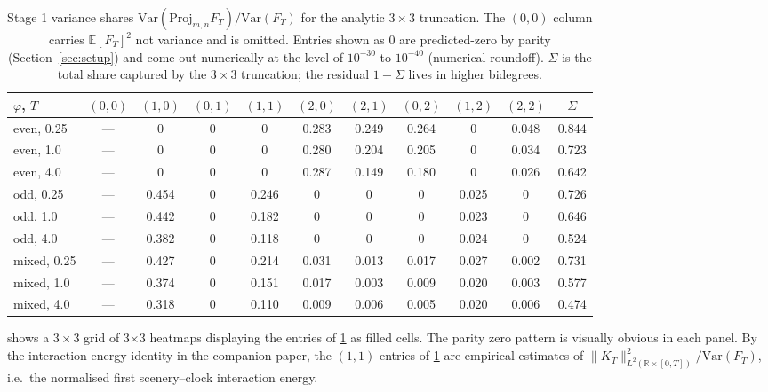 \documentclass[11pt,reqno]{amsart}
\theoremstyle{plain}
\theoremstyle{definition}
\theoremstyle{remark}
\newcommand{\R}{\mathbb{R}}
\newcommand{\E}{\mathbb{E}}
\newcommand{\Var}{\mathrm{Var}}
\newcommand{\Proj}{\mathrm{Proj}}
\begin{document}
\begin{table}[h]
\centering
\small
\begin{tabular}{lcccccccccc}
\toprule
$\varphi$, $T$ &
$(0,0)$ & $(1,0)$ & $(0,1)$ & $(1,1)$ & $(2,0)$ & $(2,1)$ &
$(0,2)$ & $(1,2)$ & $(2,2)$ & $\Sigma$\\
\midrule
even, 0.25  & --- & 0     & 0     & 0     & 0.283 & 0.249 & 0.264 & 0     & 0.048 & 0.844 \\
even, 1.0   & --- & 0     & 0     & 0     & 0.280 & 0.204 & 0.205 & 0     & 0.034 & 0.723 \\
even, 4.0   & --- & 0     & 0     & 0     & 0.287 & 0.149 & 0.180 & 0     & 0.026 & 0.642 \\[2pt]
odd, 0.25   & --- & 0.454 & 0     & 0.246 & 0     & 0     & 0     & 0.025 & 0     & 0.726 \\
odd, 1.0    & --- & 0.442 & 0     & 0.182 & 0     & 0     & 0     & 0.023 & 0     & 0.646 \\
odd, 4.0    & --- & 0.382 & 0     & 0.118 & 0     & 0     & 0     & 0.024 & 0     & 0.524 \\[2pt]
mixed, 0.25 & --- & 0.427 & 0     & 0.214 & 0.031 & 0.013 & 0.017 & 0.027 & 0.002 & 0.731 \\
mixed, 1.0  & --- & 0.374 & 0     & 0.151 & 0.017 & 0.003 & 0.009 & 0.020 & 0.003 & 0.577 \\
mixed, 4.0  & --- & 0.318 & 0     & 0.110 & 0.009 & 0.006 & 0.005 & 0.020 & 0.006 & 0.474 \\
\bottomrule
\end{tabular}
\caption{Stage 1 variance shares $\Var(\Proj_{m,n} F_T) / \Var(F_T)$
for the analytic $3 \times 3$ truncation. The $(0,0)$ column carries
$\E[F_T]^2$ not variance and is omitted. Entries shown as $0$ are
predicted-zero by parity (Section~\ref{sec:setup}) and come out
numerically at the level of $10^{-30}$ to $10^{-40}$ (numerical roundoff).
$\Sigma$ is the total share captured by the $3\times 3$ truncation;
the residual $1 - \Sigma$ lives in higher bidegrees.}
\label{tab:stage1}
\end{table}

 shows a $3 \times 3$ grid of
3$\times$3 heatmaps displaying the entries of \cref{tab:stage1} as
filled cells. The parity zero pattern is visually obvious in each
panel. By the interaction-energy identity in the companion paper,
the $(1, 1)$ entries of \cref{tab:stage1} are empirical estimates of
$\|K_T\|_{L^2(\R \times [0, T])}^2 / \Var(F_T)$, i.e.\ the normalised
first scenery--clock interaction energy.
\end{document}
